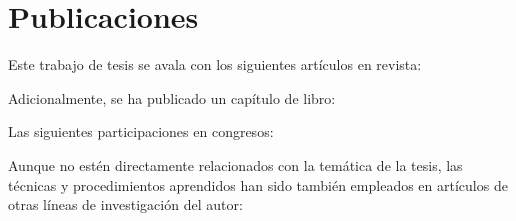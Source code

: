\chapter*{Publicaciones}



Este trabajo de tesis se avala con los siguientes artículos en revista:

\begin{refsection}[jcr]
    \setlength{\biblabelsep}{0pt}
    \small
    \nocite{*} %
    \printbibliography[heading=none]
\end{refsection}

Adicionalmente, se ha publicado un capítulo de libro:

\begin{refsection}[libros]
    \setlength{\biblabelsep}{0pt}
    \small
    \nocite{*} %
    \printbibliography[heading=none]
\end{refsection}

Las siguientes participaciones en congresos:

\begin{refsection}[congresos]
    \setlength{\biblabelsep}{0pt}
    \small
    \nocite{*} %
    \printbibliography[heading=none]
\end{refsection}

Aunque no estén directamente relacionados con la temática de la tesis, las técnicas y procedimientos aprendidos han sido también empleados en artículos de otras líneas de investigación del autor:

\begin{refsection}[jcrNO]
    \setlength{\biblabelsep}{0pt}
    \small
    \nocite{*} %
    \printbibliography[heading=none]
\end{refsection}

